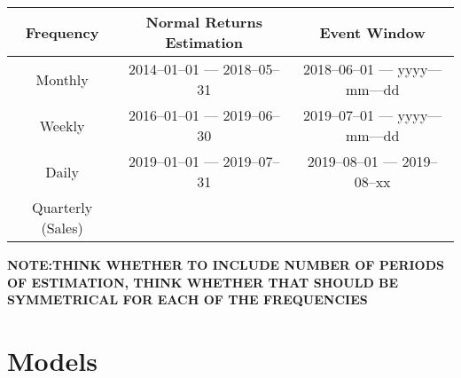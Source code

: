 \documentclass[12pt]{article}
\begin{document}
\begin{table}[!h]
    \label{tab:data_freq}
    \begin{tabular}{ccc}
        \toprule
        Frequency & Normal Returns Estimation & Event Window \\
        \midrule
        Monthly & 2014--01--01 --- 2018--05--31 & 2018--06--01 --- yyyy---mm---dd \\ 
        Weekly & 2016--01--01 --- 2019--06--30 & 2019--07--01 --- yyyy---mm---dd \\
        Daily & 2019--01--01 --- 2019--07--31 & 2019--08--01 --- 2019--08--xx\\
        Quarterly (Sales) && \\ 
        \bottomrule
    \end{tabular}
    \begin{tablenotes}
        \footnotesize
        \item \textbf{NOTE:\@ THINK WHETHER TO INCLUDE NUMBER OF PERIODS OF ESTIMATION, THINK WHETHER THAT SHOULD BE SYMMETRICAL FOR EACH OF THE FREQUENCIES}
      \end{tablenotes}
\end{table}


\newpage
\normalsize
\raggedright{}
\section{Models}\label{app:models}
\small
\centering

\end{document}
